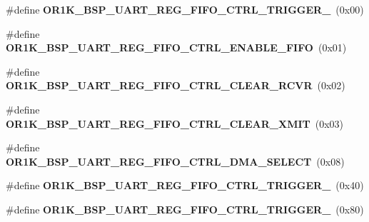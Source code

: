 \begin{DoxyCompactItemize}
\item 
\mbox{\label{group__generic__or1k__reg_ga6647bc4130ef7f6b0e61131247fa3c0f}} 
\#define {\bfseries O\+R1\+K\+\_\+\+B\+S\+P\+\_\+\+U\+A\+R\+T\+\_\+\+R\+E\+G\+\_\+\+F\+I\+F\+O\+\_\+\+C\+T\+R\+L\+\_\+\+T\+R\+I\+G\+G\+E\+R\+\_}~(0x00)
\item 
\mbox{\label{group__generic__or1k__reg_gafb10d84890d7a5cb2b8f06824ec149b3}} 
\#define {\bfseries O\+R1\+K\+\_\+\+B\+S\+P\+\_\+\+U\+A\+R\+T\+\_\+\+R\+E\+G\+\_\+\+F\+I\+F\+O\+\_\+\+C\+T\+R\+L\+\_\+\+E\+N\+A\+B\+L\+E\+\_\+\+F\+I\+FO}~(0x01)
\item 
\mbox{\label{group__generic__or1k__reg_gafc006c96a70aa9e4974b9dc26fc1e628}} 
\#define {\bfseries O\+R1\+K\+\_\+\+B\+S\+P\+\_\+\+U\+A\+R\+T\+\_\+\+R\+E\+G\+\_\+\+F\+I\+F\+O\+\_\+\+C\+T\+R\+L\+\_\+\+C\+L\+E\+A\+R\+\_\+\+R\+C\+VR}~(0x02)
\item 
\mbox{\label{group__generic__or1k__reg_gab8518dee74a6894b3c76389522ef3379}} 
\#define {\bfseries O\+R1\+K\+\_\+\+B\+S\+P\+\_\+\+U\+A\+R\+T\+\_\+\+R\+E\+G\+\_\+\+F\+I\+F\+O\+\_\+\+C\+T\+R\+L\+\_\+\+C\+L\+E\+A\+R\+\_\+\+X\+M\+IT}~(0x03)
\item 
\mbox{\label{group__generic__or1k__reg_ga22e79a460e85d8f1dfdc7eacb285063c}} 
\#define {\bfseries O\+R1\+K\+\_\+\+B\+S\+P\+\_\+\+U\+A\+R\+T\+\_\+\+R\+E\+G\+\_\+\+F\+I\+F\+O\+\_\+\+C\+T\+R\+L\+\_\+\+D\+M\+A\+\_\+\+S\+E\+L\+E\+CT}~(0x08)
\item 
\mbox{\label{group__generic__or1k__reg_ga0ec393076db07319d0ad75ac6d50f24c}} 
\#define {\bfseries O\+R1\+K\+\_\+\+B\+S\+P\+\_\+\+U\+A\+R\+T\+\_\+\+R\+E\+G\+\_\+\+F\+I\+F\+O\+\_\+\+C\+T\+R\+L\+\_\+\+T\+R\+I\+G\+G\+E\+R\+\_}~(0x40)
\item 
\mbox{\label{group__generic__or1k__reg_ga51d784fa9aa62b614000bf8adb2a6a66}} 
\#define {\bfseries O\+R1\+K\+\_\+\+B\+S\+P\+\_\+\+U\+A\+R\+T\+\_\+\+R\+E\+G\+\_\+\+F\+I\+F\+O\+\_\+\+C\+T\+R\+L\+\_\+\+T\+R\+I\+G\+G\+E\+R\+\_}~(0x80)
\item 
\mbox{\label{group__generic__or1k__reg_gaf0e2a79aeb3b67f0a5181a399796f173}} 

\end{DoxyCompactItemize}

